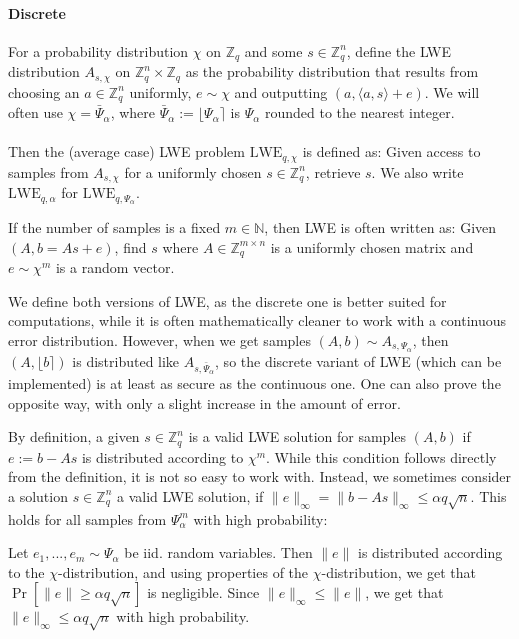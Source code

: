 \documentclass{report}
\newcommand{\Z}{\mathbb{Z}}
\begin{document}
\paragraph{Discrete}
For a probability distribution $\chi$ on $\Z_q$ and some $s \in \Z_q^n$, define the LWE distribution $A_{s, \chi}$ on $\Z_q^n \times \Z_q$ as the probability distribution that results from choosing an $a \in \Z_q^n$ uniformly, $e \sim \chi$ and outputting $(a, \langle a, s \rangle + e)$. We will often use $\chi = \bar{\Psi}_\alpha$, where $\bar{\Psi}_\alpha := \lfloor \Psi_\alpha \rceil$ is $\Psi_\alpha$ rounded to the nearest integer.
\\\\
Then the (average case) LWE problem $\mathrm{LWE}_{q, \chi}$ is defined as: Given access to samples from $A_{s, \chi}$ for a uniformly chosen $s \in \Z_q^n$, retrieve $s$. We also write $\mathrm{LWE}_{q, \alpha}$ for $\mathrm{LWE}_{q, \Psi_\alpha}$.

If the number of samples is a fixed $m \in \mathbb{N}$, then LWE is often written as: Given $(A, b = As + e)$, find $s$ where $A \in \Z_q^{m \times n}$ is a uniformly chosen matrix and $e \sim \chi^m$ is a random vector.

\remark
We define both versions of LWE, as the discrete one is better suited for computations, while it is often mathematically cleaner to work with a continuous error distribution. However, when we get samples $(A, b) \sim A_{s, \Psi_\alpha}$, then $(A, \lfloor b \rceil)$ is distributed like $A_{s, \bar{\Psi}_\alpha}$, so the discrete variant of LWE (which can be implemented) is at least as secure as the continuous one. One can also prove the opposite way, with only a slight increase in the amount of error.

By definition, a given $s \in \Z_q^n$ is a valid LWE solution for samples $(A, b)$ if $e := b - As$ is distributed according to $\chi^m$. While this condition follows directly from the definition, it is not so easy to work with. Instead, we sometimes consider a solution $s \in \Z_q^n$ a valid LWE solution, if $\| e \|_\infty = \| b - As \|_\infty \leq \alpha q\sqrt{n}$. This holds for all samples from $\Psi_\alpha^m$ with high probability: 

Let $e_1, ..., e_m \sim \Psi_\alpha$ be iid. random variables. Then $\| e \|$ is distributed according to the $\chi$-distribution, and using properties of the $\chi$-distribution, we get that $\Pr[\| e \| \geq \alpha q\sqrt{n}]$ is negligible. Since $\| e \|_\infty \leq \| e \|$, we get that $\| e \|_\infty \leq \alpha q\sqrt{n}$ with high probability.
\end{document}
